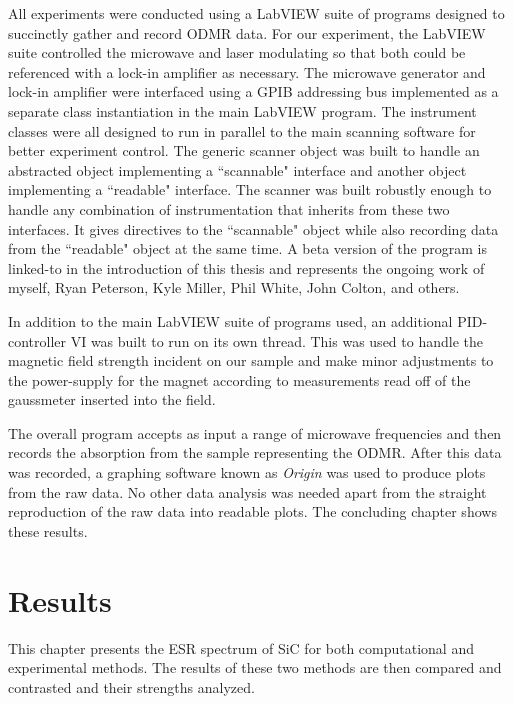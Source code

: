 \documentclass[oneside, astronomy, noacknowlegments]{BYUPhys}
\begin{document}
All experiments were conducted using a LabVIEW suite of programs designed to succinctly gather and record ODMR data. For our experiment, the LabVIEW suite controlled the microwave and laser modulating so that both could be referenced with a lock-in amplifier as necessary. The microwave generator and lock-in amplifier were interfaced using a GPIB addressing bus implemented as a separate class instantiation in the main LabVIEW program. The instrument classes were all designed to run in parallel to the main scanning software for better experiment control. The generic scanner object was built to handle an abstracted object implementing a ``scannable" interface and another object implementing a ``readable" interface. The scanner was built robustly enough to handle any combination of instrumentation that inherits from these two interfaces. It gives directives to the ``scannable" object while also recording data from the ``readable" object at the same time. A beta version of the program is linked-to in the introduction of this thesis and represents the ongoing work of myself, Ryan Peterson, Kyle Miller, Phil White, John Colton, and others.

In addition to the main LabVIEW suite of programs used, an additional PID-controller VI was built to run on its own thread. This was used to handle the magnetic field strength incident on our sample and make minor adjustments to the power-supply for the magnet according to measurements read off of the gaussmeter inserted into the field.

The overall program accepts as input a range of microwave frequencies and then records the absorption from the sample representing the ODMR. After this data was recorded, a graphing software known as \textit{Origin} was used to produce plots from the raw data. No other data analysis was needed apart from the straight reproduction of the raw data into readable plots. The concluding chapter shows these results.










\chapter{Results}

This chapter presents the ESR spectrum of SiC for both computational and experimental methods. The results of these two methods are then compared and contrasted and their strengths analyzed.
\end{document}
